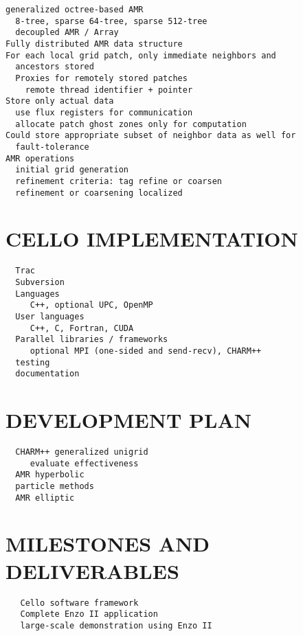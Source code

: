 \documentclass[14pt,letter]{article}
\begin{document}
\begin{verbatim}
generalized octree-based AMR 
  8-tree, sparse 64-tree, sparse 512-tree
  decoupled AMR / Array
Fully distributed AMR data structure
For each local grid patch, only immediate neighbors and
  ancestors stored
  Proxies for remotely stored patches
    remote thread identifier + pointer
Store only actual data
  use flux registers for communication
  allocate patch ghost zones only for computation
Could store appropriate subset of neighbor data as well for
  fault-tolerance
AMR operations
  initial grid generation
  refinement criteria: tag refine or coarsen
  refinement or coarsening localized
\end{verbatim}


\section{CELLO IMPLEMENTATION} \label{s:implementation}


\begin{verbatim}
  Trac
  Subversion
  Languages
     C++, optional UPC, OpenMP
  User languages
     C++, C, Fortran, CUDA
  Parallel libraries / frameworks
     optional MPI (one-sided and send-recv), CHARM++
  testing
  documentation
\end{verbatim}
  
\section{DEVELOPMENT PLAN} \label{s:plan}

\begin{verbatim}
  CHARM++ generalized unigrid
     evaluate effectiveness
  AMR hyperbolic
  particle methods
  AMR elliptic
\end{verbatim}

\section{MILESTONES AND DELIVERABLES} \label{s:milestones}

\begin{verbatim}
   Cello software framework
   Complete Enzo II application
   large-scale demonstration using Enzo II
\end{verbatim}
\end{document}

